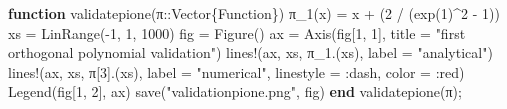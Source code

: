 \documentclass[
]{article}
\newenvironment{Shaded}{\begin{snugshade}}{\end{snugshade}}
\newcommand{\ConstantTok}[1]{\textcolor[rgb]{0.56,0.35,0.01}{#1}}
\newcommand{\DataTypeTok}[1]{\textcolor[rgb]{0.68,0.00,0.00}{#1}}
\newcommand{\FloatTok}[1]{\textcolor[rgb]{0.68,0.00,0.00}{#1}}
\newcommand{\FunctionTok}[1]{\textcolor[rgb]{0.28,0.35,0.67}{#1}}
\newcommand{\KeywordTok}[1]{\textcolor[rgb]{0.00,0.23,0.31}{\textbf{#1}}}
\newcommand{\NormalTok}[1]{\textcolor[rgb]{0.00,0.23,0.31}{#1}}
\newcommand{\OperatorTok}[1]{\textcolor[rgb]{0.37,0.37,0.37}{#1}}
\newcommand{\StringTok}[1]{\textcolor[rgb]{0.13,0.47,0.30}{#1}}
\begin{document}
\begin{Shaded}
\begin{Highlighting}[]
\KeywordTok{function} \FunctionTok{validatepione}\NormalTok{(}\ConstantTok{π}\OperatorTok{::}\DataTypeTok{Vector\{Function\}}\NormalTok{)}
    \FunctionTok{π\_1}\NormalTok{(x) }\OperatorTok{=}\NormalTok{ x }\OperatorTok{+}\NormalTok{ (}\FloatTok{2} \OperatorTok{/}\NormalTok{ (}\FunctionTok{exp}\NormalTok{(}\FloatTok{1}\NormalTok{)}\OperatorTok{\^{}}\FloatTok{2} \OperatorTok{{-}} \FloatTok{1}\NormalTok{))}
\NormalTok{    xs }\OperatorTok{=} \FunctionTok{LinRange}\NormalTok{(}\OperatorTok{{-}}\FloatTok{1}\NormalTok{, }\FloatTok{1}\NormalTok{, }\FloatTok{1000}\NormalTok{)}
\NormalTok{    fig }\OperatorTok{=} \FunctionTok{Figure}\NormalTok{()}
\NormalTok{    ax }\OperatorTok{=} \FunctionTok{Axis}\NormalTok{(fig[}\FloatTok{1}\NormalTok{, }\FloatTok{1}\NormalTok{], title }\OperatorTok{=} \StringTok{"first orthogonal polynomial validation"}\NormalTok{)}
    \FunctionTok{lines!}\NormalTok{(ax, xs, }\FunctionTok{π\_1}\NormalTok{.(xs), label }\OperatorTok{=} \StringTok{"analytical"}\NormalTok{)}
    \FunctionTok{lines!}\NormalTok{(ax, xs, }\ConstantTok{π}\NormalTok{[}\FloatTok{3}\NormalTok{].(xs), label }\OperatorTok{=} \StringTok{"numerical"}\NormalTok{, linestyle }\OperatorTok{=} \OperatorTok{:}\NormalTok{dash, color }\OperatorTok{=} \OperatorTok{:}\NormalTok{red)}
    \FunctionTok{Legend}\NormalTok{(fig[}\FloatTok{1}\NormalTok{, }\FloatTok{2}\NormalTok{], ax)}
    \FunctionTok{save}\NormalTok{(}\StringTok{"validationpione.png"}\NormalTok{, fig)}
\KeywordTok{end}
\FunctionTok{validatepione}\NormalTok{(}\ConstantTok{π}\NormalTok{);}
\end{Highlighting}
\end{Shaded}

\begin{figure}


\caption{\label{fig-q1pa}}

\end{figure}%
\end{document}

